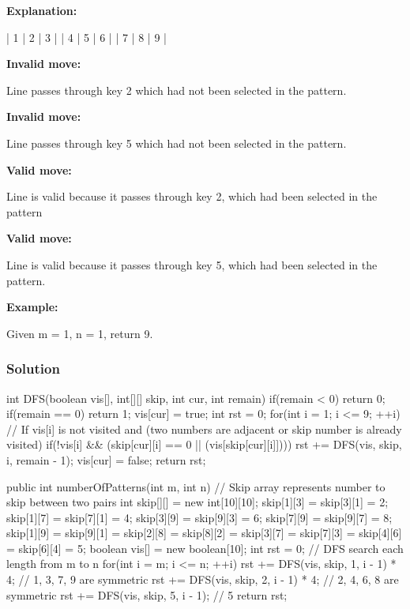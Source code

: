 \textbf{Explanation:}
\begin{Code}
| 1 | 2 | 3 |
| 4 | 5 | 6 |
| 7 | 8 | 9 |
\end{Code}

\textbf{Invalid move:} 

Line  passes through key 2 which had not been selected in the pattern.

\textbf{Invalid move:} 

Line  passes through key 5 which had not been selected in the pattern.

\textbf{Valid move:} 

Line  is valid because it passes through key 2, which had been selected in the pattern

\textbf{Valid move:} 

Line  is valid because it passes through key 5, which had been selected in the pattern.

\textbf{Example:}

Given m = 1, n = 1, return 9.

\newpage

\subsubsection{Solution}
\begin{Code}
int DFS(boolean vis[], int[][] skip, int cur, int remain) {
    if(remain < 0) return 0;
    if(remain == 0) return 1;
    vis[cur] = true;
    int rst = 0;
    for(int i = 1; i <= 9; ++i) {
        // If vis[i] is not visited and (two numbers are adjacent or skip number is already visited)
        if(!vis[i] && (skip[cur][i] == 0 || (vis[skip[cur][i]]))) {
            rst += DFS(vis, skip, i, remain - 1);
        }
    }
    vis[cur] = false;
    return rst;
}

public int numberOfPatterns(int m, int n) {
    // Skip array represents number to skip between two pairs
    int skip[][] = new int[10][10];
    skip[1][3] = skip[3][1] = 2;
    skip[1][7] = skip[7][1] = 4;
    skip[3][9] = skip[9][3] = 6;
    skip[7][9] = skip[9][7] = 8;
    skip[1][9] = skip[9][1] = skip[2][8] = skip[8][2] = skip[3][7] = skip[7][3] = skip[4][6] = skip[6][4] = 5;
    boolean vis[] = new boolean[10];
    int rst = 0;
    // DFS search each length from m to n
    for(int i = m; i <= n; ++i) {
        rst += DFS(vis, skip, 1, i - 1) * 4;    // 1, 3, 7, 9 are symmetric
        rst += DFS(vis, skip, 2, i - 1) * 4;    // 2, 4, 6, 8 are symmetric
        rst += DFS(vis, skip, 5, i - 1);        // 5
    }
    return rst;
}
\end{Code}
\newpage